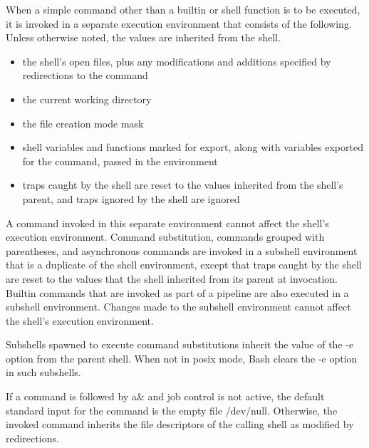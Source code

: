 When a simple command other than a builtin or shell function is to be executed, it is invoked in a separate execution environment that consists of the following. Unless otherwise noted, the values are inherited from the shell.
\begin{itemize}
    \item  the shell's open files, plus any modifications and additions specified by redirections to the command
    \item  the current working directory
    \item  the file creation mode mask
    \item  shell variables and functions marked for export, along with variables exported for the command, passed in the environment
    \item  traps caught by the shell are reset to the values inherited from the shell's parent, and traps ignored by the shell are ignored
\end{itemize}
A command invoked in this separate environment cannot affect the shell's execution environment.
Command substitution, commands grouped with parentheses, and asynchronous commands are invoked in a subshell environment that is a duplicate of the shell environment, except that traps caught by the shell are reset to the values that the shell inherited from its parent at invocation. Builtin commands that are invoked as part of a pipeline are also executed in a subshell environment. Changes made to the subshell environment cannot affect the shell's execution environment.

Subshells spawned to execute command substitutions inherit the value of the -e option from the parent shell. When not in posix mode, Bash clears the -e option in such subshells.

If a command is followed by a\& and job control is not active, the default standard input for the command is the empty file /dev/null. Otherwise, the invoked command inherits the file descriptors of the calling shell as modified by redirections.